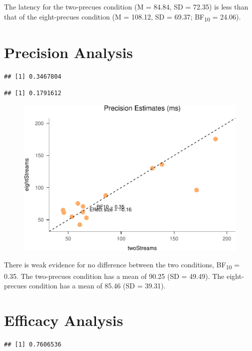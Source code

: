 \documentclass[,man]{apa6}
\theoremstyle{definition}
\theoremstyle{definition}
\theoremstyle{definition}
\theoremstyle{remark}
\begin{document}
The latency for the two-precues condition (M = 84.84, SD = 72.35) is
less than that of the eight-precues condition (M = 108.12, SD = 69.37;
BF\textsubscript{10} = 24.06).

\section{Precision Analysis}\label{precision-analysis-1}

\begin{verbatim}
## [1] 0.3467804
\end{verbatim}

\begin{verbatim}
## [1] 0.1791612
\end{verbatim}

\begin{figure}
\centering
\includegraphics{nStreams_Bayesian_files/figure-latex/unnamed-chunk-9-1.pdf}
\caption{}
\end{figure}

There is weak evidence for no difference between the two conditions,
BF\textsubscript{10} = 0.35. The two-precues condition has a mean of
90.25 (SD = 49.49). The eight-precues condition has a mean of 85.46 (SD
= 39.31).

\section{Efficacy Analysis}\label{efficacy-analysis-1}

\begin{verbatim}
## [1] 0.7606536
\end{verbatim}
\end{document}
